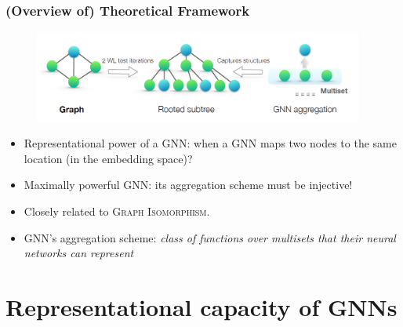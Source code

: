 \documentclass[handout]{beamer}
\begin{document}
\begin{frame}
\frametitle{(Overview of) Theoretical Framework}

\begin{figure}[hbt]
	\includegraphics[height=3cm]{fig2.png}
\end{figure}

\begin{itemize}
    \item Representational power of a GNN: when a GNN maps two nodes to the same location (in the embedding space)? \pause
    
    \item Maximally powerful GNN: its aggregation scheme must be \alert{injective}! \pause
    
    \item Closely related to \textsc{Graph Isomorphism}. \pause
    
    \item GNN's aggregation scheme: {\it class of functions over multisets that their neural networks can represent}
\end{itemize}
\end{frame}


\section{Representational capacity of GNNs}
\end{document}
